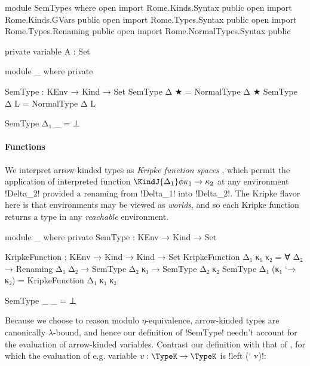 \begin{AgdaAlign}
\begin{code}[hide]
module SemTypes where
  open import Rome.Kinds.Syntax public 
  open import Rome.Kinds.GVars public 
  open import Rome.Types.Syntax public
  open import Rome.Types.Renaming public
  open import Rome.NormalTypes.Syntax public
  
  private
    variable
      A : Set
\end{code}

\begin{code}[hide]
  module _ where private
\end{code}
\begin{code}
    SemType : KEnv → Kind → Set
    SemType Δ ★ = NormalType Δ ★
    SemType Δ L = NormalType Δ L
\end{code}
\begin{code}[hide]
    SemType Δ₁ _ = ⊥
\end{code}


\paragraph{Functions} We interpret arrow-kinded types as \emph{Kripke function spaces} \citep{JungT93, Abel13}, which permit the application of interpreted function $\KindJ {\Delta_1} \phi {\kappa_1 \to \kappa_2}$ at any environment !Delta_2! provided a renaming from !Delta_1! into !Delta_2!. The Kripke flavor here is that environments may be viewed as \emph{worlds}, and so each Kripke function returns a type in any \emph{reachable} environment.

\begin{code}[hide]
  module _ where private
    SemType : KEnv → Kind → Set
\end{code}
\begin{code}
    KripkeFunction : KEnv → Kind → Kind → Set
    KripkeFunction Δ₁ κ₁ κ₂ =  
      ∀ {Δ₂} → Renaming Δ₁ Δ₂ → 
                SemType Δ₂ κ₁ → SemType Δ₂ κ₂
    SemType Δ₁ (κ₁ `→ κ₂) = KripkeFunction Δ₁ κ₁ κ₂
\end{code}
\begin{code}[hide]
    SemType _ _ = ⊥
\end{code}

Because we choose to reason modulo $\eta$-equivalence, arrow-kinded types are canonically $\lambda$-bound, and hence our definition of !SemType! needn't account for the evaluation of arrow-kinded variables. Contrast our definition with that of \citet{ChapmanKNW19}, for which the evaluation of e.g. variable $v : \TypeK \to \TypeK$ is !left (` v)!: 


\end{AgdaAlign}
